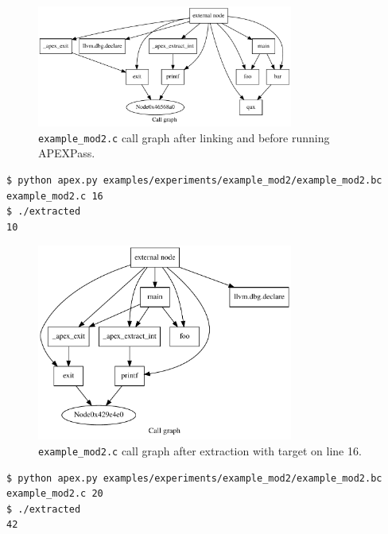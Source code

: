 \documentclass[12pt, twoside]{fithesis2}
\renewcommand{\_}{\leavevmode \kern0.07em\vbox{\hrule width0.4em}}
\begin{document}
\begin{figure}[ht]
    \centering
    \includegraphics[width=0.75\textwidth]{images/experiments/mod2_linked.pdf}
    \caption{
    \texttt{example_mod2.c}
    call graph after linking and before running APEXPass.
    }
    \label{fig:exp_img_mod2}
\end{figure}

\begin{verbatim}
$ python apex.py examples/experiments/example_mod2/example_mod2.bc example_mod2.c 16
$ ./extracted
10
\end{verbatim}

\begin{figure}[ht]
    \centering
    \includegraphics[width=0.75\textwidth]{images/experiments/mod2_target16.pdf}
    \caption{
    \texttt{example_mod2.c}
    call graph after extraction with target on line 16.
    }
    \label{fig:exp_img_mod2_target16}
\end{figure}

\begin{verbatim}
$ python apex.py examples/experiments/example_mod2/example_mod2.bc example_mod2.c 20
$ ./extracted
42
\end{verbatim}
\end{document}

